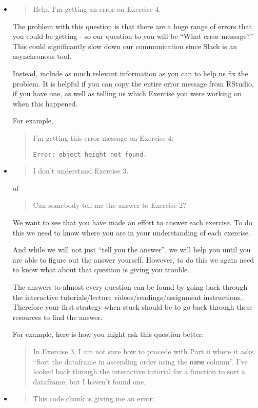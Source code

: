 \documentclass[
]{book}
\begin{document}
\begin{itemize}
\item
  \begin{quote}
  Help, I'm getting an error on Exercise 4.
  \end{quote}

  The problem with this question is that there are a huge range of errors that you could be getting - so our question to you will be ``What error message?'' This could significantly slow down our communication since Slack is an asynchronous tool.

  Instead, include as much relevant information as you can to help us fix the problem. It is helpful if you can copy the entire error message from RStudio, if you have one, as well as telling us which Exercise you were working on when this happened.

  For example,

  \begin{quote}
  I'm getting this error message on Exercise 4:

  \texttt{Error:\ object\ \textquotesingle{}height\textquotesingle{}\ not\ found.}
  \end{quote}
\item
  \begin{quote}
  I don't understand Exercise 3.
  \end{quote}

  of

  \begin{quote}
  Can somebody tell me the answer to Exercise 2?
  \end{quote}

  We want to see that you have made an effort to answer each exercise. To do this we need to know where you are in your understanding of each exercise.

  And while we will not just ``tell you the answer'', we will help you until you are able to figure out the answer yourself. However, to do this we again need to know what about that question is giving you trouble.

  The answers to almost every question can be found by going back through the interactive tutorials/lecture videos/readings/assignment instructions. Therefore your first strategy when stuck should be to go back through these resources to find the answer.

  For example, here is how you might ask this question better:

  \begin{quote}
  In Exercise 3, I am not sure how to procede with Part ii where it asks ``Sort the dataframe in ascending order using the \texttt{name} column''. I've looked back through the interactive tutorial for a function to sort a dataframe, but I haven't found one.
  \end{quote}
\item
  \begin{quote}
  This code chunk is giving me an error:


\end{quote}
\end{itemize}
\end{document}
